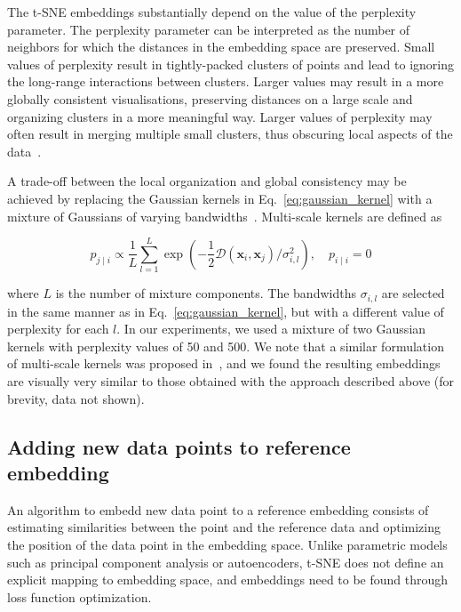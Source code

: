 \documentclass[runningheads]{llncs}
\begin{document}
The t-SNE embeddings substantially depend on the value of the perplexity parameter. The perplexity parameter can be interpreted as the number of neighbors for which the distances in the embedding space are preserved. Small values of perplexity result in tightly-packed clusters of points and lead to ignoring the long-range interactions between clusters. Larger values may result in a more globally consistent visualisations, preserving distances on a large scale and organizing clusters in a more meaningful way. Larger values of perplexity may often result in merging multiple small clusters, thus obscuring local aspects of the data~\cite{art_of_using_tsne}.

A trade-off between the local organization and global consistency may be achieved by replacing the Gaussian kernels in Eq.~\ref{eq:gaussian_kernel} with a mixture of Gaussians of varying bandwidths~\cite{multiscale_tsne}. Multi-scale kernels are defined as

\begin{equation}
p_{j \mid i} \propto \frac{1}{L} \sum_{l=1}^{L} \exp \left ( - \frac{1}{2} \mathcal{D}(\mathbf{x}_i, \mathbf{x}_j ) / \sigma_{i,l}^2 \right ), \quad p_{i \mid i} = 0
\label{eq:multiscale}
\end{equation}

\noindent where $L$ is the number of mixture components. The bandwidths $\sigma_{i,l}$ are selected in the same manner as in Eq.~\ref{eq:gaussian_kernel}, but with a different value of perplexity for each $l$. In our experiments, we used a mixture of two Gaussian kernels with perplexity values of 50 and 500. We note that a similar formulation of multi-scale kernels was proposed in~\cite{art_of_using_tsne}, and we found the resulting embeddings are visually very similar to those obtained with the approach described above (for brevity, data not shown).


\subsection{Adding new data points to reference embedding\label{sec:transfer}}

An algorithm to embedd new data point to a reference embedding consists of estimating similarities between the point and the reference data and optimizing the position of the data point in the embedding space. Unlike parametric models such as principal component analysis or autoencoders, t-SNE does not define an explicit mapping to embedding space, and embeddings need to be found through loss function optimization.
\end{document}
